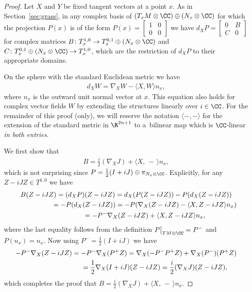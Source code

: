\begin{proof} Let $X$ and $Y$ be fixed tangent vectors at a point $x$. As in Section~\ref{sec;grass}, in any complex basis of $(T_xM \otimes \CC) \oplus (N_x \otimes \CC)$ for which the projection $P(x)$ is of the form
$P(x) = \left[\begin{smallmatrix}
1 & 0 \\
0& 0
\end{smallmatrix}\right]$ we have
$d_X P =\left[
\begin{smallmatrix}
0 & B \\
C& 0
\end{smallmatrix}\right] $ for complex matrices $B\colon T^{1,0}_x \to T^{0,1}_x \oplus ( N_x \otimes \CC )$ and $C \colon T^{0,1}_x \oplus ( N_x \otimes \CC ) \to T^{1,0}_x$, which are the restriction of $d_X P$ to their appropriate domains.

On the sphere with the standard Euclidean metric we have
\begin{gather} \label{eq;NablaSphere}
d_X W = \nabla_X W - \langle X,W \rangle n_x,
\end{gather}
where $n_x$ is the outward unit normal vector at $x$. This equation also holds for complex vector fields $W$ by extending the structures linearly over $i \in \CC$. For the remainder of this proof (only), we will reserve the notation $ \langle - , - \rangle$ for the extension of the standard metric in $\R^{2n+1}$ to a~bilinear map which is $\CC$-linear \emph{in both entries}.

We first show that
\begin{gather*}
B= \frac i 2 (\nabla_X J) + \langle X , \, -\, \rangle n_x,
\end{gather*}
which is not surprising since $P = \frac 1 2 (I + i J) \oplus \pi_{N_x \otimes \CC}$.
Explicitly, for any $Z - i JZ \in T^{1,0} $ we have
\begin{gather*}
B(Z-iJZ) = (d_XP)(Z-iJZ) = d_X(P(Z - iJZ)) - P(d_X(Z-iJZ)) \\
\hphantom{B(Z-iJZ)}{} = - P(d_X(Z-iJZ)) = -P ( \nabla_X (Z-iJZ) - \langle X,Z - iJZ \rangle n_x )\\
\hphantom{B(Z-iJZ)}{}= - P^- \nabla_X (Z-iJZ) + \langle X,Z - iJZ \rangle n_x ,
\end{gather*}
where the last equality follows from the definition $P\big|_{TM \otimes \CC} = P^- $ and $P(n_x) = n_x$. Now using $P^- = \frac 1 2 (I + i J)$ we have
\begin{gather*}
 -P^- \nabla_X (Z-iJZ) = -P^- \nabla_X (P^+ Z) = \nabla_X ( -P^- P^+ Z) + \nabla_X (P^-) (P^+ Z) \\
 \hphantom{-P^- \nabla_X (Z-iJZ)}{} =\frac 1 2 \nabla_X (I +iJ) (Z-iJZ) = \frac i 2 (\nabla_X J )(Z- i J Z),
\end{gather*}
which completes the proof that $B= \frac i 2 (\nabla_X J) + \langle X , \, -\, \rangle n_x$.


\end{proof}
